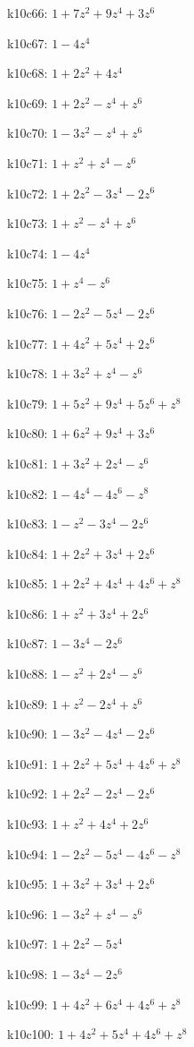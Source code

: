 k10c66: $ 1+7z^{2}+9z^{4}+3z^{6} $ 

k10c67: $ 1-4z^{4} $ 

k10c68: $ 1+2z^{2}+4z^{4} $ 

k10c69: $ 1+2z^{2}-z^{4}+z^{6} $ 

k10c70: $ 1-3z^{2}-z^{4}+z^{6} $ 

k10c71: $ 1+z^{2}+z^{4}-z^{6} $ 

k10c72: $ 1+2z^{2}-3z^{4}-2z^{6} $ 

k10c73: $ 1+z^{2}-z^{4}+z^{6} $ 

k10c74: $ 1-4z^{4} $ 

k10c75: $ 1+z^{4}-z^{6} $ 

k10c76: $ 1-2z^{2}-5z^{4}-2z^{6} $ 

k10c77: $ 1+4z^{2}+5z^{4}+2z^{6} $ 

k10c78: $ 1+3z^{2}+z^{4}-z^{6} $ 

k10c79: $ 1+5z^{2}+9z^{4}+5z^{6}+z^{8} $ 

k10c80: $ 1+6z^{2}+9z^{4}+3z^{6} $ 

k10c81: $ 1+3z^{2}+2z^{4}-z^{6} $ 

k10c82: $ 1-4z^{4}-4z^{6}-z^{8} $ 

k10c83: $ 1-z^{2}-3z^{4}-2z^{6} $ 

k10c84: $ 1+2z^{2}+3z^{4}+2z^{6} $ 

k10c85: $ 1+2z^{2}+4z^{4}+4z^{6}+z^{8} $ 

k10c86: $ 1+z^{2}+3z^{4}+2z^{6} $ 

k10c87: $ 1-3z^{4}-2z^{6} $ 

k10c88: $ 1-z^{2}+2z^{4}-z^{6} $ 

k10c89: $ 1+z^{2}-2z^{4}+z^{6} $ 

k10c90: $ 1-3z^{2}-4z^{4}-2z^{6} $ 

k10c91: $ 1+2z^{2}+5z^{4}+4z^{6}+z^{8} $ 

k10c92: $ 1+2z^{2}-2z^{4}-2z^{6} $ 

k10c93: $ 1+z^{2}+4z^{4}+2z^{6} $ 

k10c94: $ 1-2z^{2}-5z^{4}-4z^{6}-z^{8} $ 

k10c95: $ 1+3z^{2}+3z^{4}+2z^{6} $ 

k10c96: $ 1-3z^{2}+z^{4}-z^{6} $ 

k10c97: $ 1+2z^{2}-5z^{4} $ 

k10c98: $ 1-3z^{4}-2z^{6} $ 

k10c99: $ 1+4z^{2}+6z^{4}+4z^{6}+z^{8} $ 

k10c100: $ 1+4z^{2}+5z^{4}+4z^{6}+z^{8} $ 

